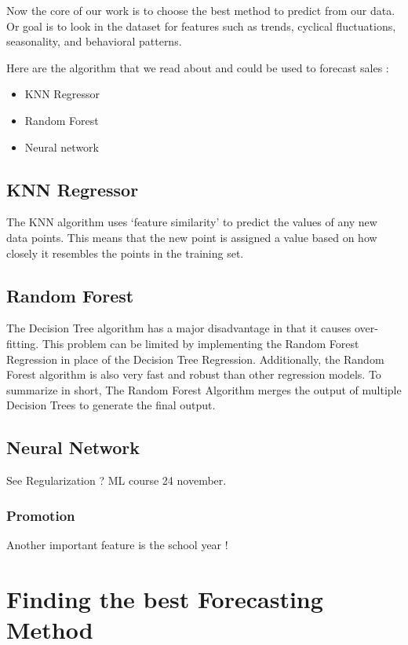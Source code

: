\documentclass{report}
\begin{document}
Now the core of our work is to choose the best method to predict from our data. Or goal is to look in the dataset for features such as trends, cyclical fluctuations, seasonality, and behavioral patterns.


Here are the algorithm that we read about and could be used to forecast sales :
\begin{itemize}
\item KNN Regressor
\item Random Forest
\item Neural network
\end{itemize}

\section{KNN Regressor}
The KNN algorithm uses ‘feature similarity’ to predict the values of any new data points. This means that the new point is assigned a value based on how closely it resembles the points in the training set.


\section{Random Forest}
The Decision Tree algorithm has a major disadvantage in that it causes over-fitting.
This problem can be limited by implementing the Random Forest Regression in place of the Decision Tree Regression.
Additionally, the Random Forest algorithm is also very fast and robust than other regression models.
To summarize in short, The Random Forest Algorithm merges the output of multiple Decision Trees to generate the final output.

\section{Neural Network}




See Regularization ? ML course 24 november.


\subsection{Promotion}
Another important feature is the school year !

\chapter{Finding the best Forecasting Method}
\end{document}
